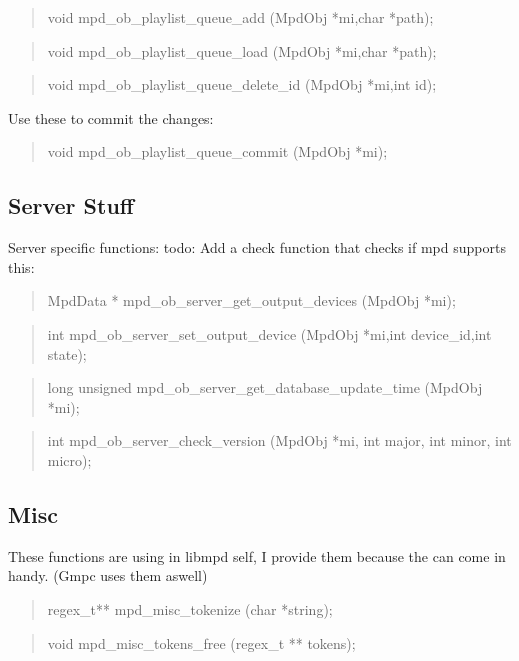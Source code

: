 \documentclass[a4paper,11pt]{article}
\begin{document}
	\begin{quote}
	void 		mpd\_ob\_playlist\_queue\_add		(MpdObj *mi,char *path);
	\end{quote}
	
	\begin{quote}
	void 		mpd\_ob\_playlist\_queue\_load		(MpdObj *mi,char *path);
	\end{quote}
	\begin{quote}
	void 		mpd\_ob\_playlist\_queue\_delete\_id		(MpdObj *mi,int id);
	\end{quote}
	
	Use these to commit the changes:
	\begin{quote}
	void 		mpd\_ob\_playlist\_queue\_commit		(MpdObj *mi);
	\end{quote}
	
	\subsection{Server Stuff}
	
	Server specific functions:
	todo: Add a check function that checks if mpd supports this:
	\begin{quote}
	MpdData * 	mpd\_ob\_server\_get\_output\_devices	(MpdObj *mi);
	\end{quote}
	
	\begin{quote}
	int 		mpd\_ob\_server\_set\_output\_device		(MpdObj *mi,int device\_id,int state);
	\end{quote}
	\begin{quote}
	long unsigned	mpd\_ob\_server\_get\_database\_update\_time	(MpdObj *mi);
	\end{quote}
	\begin{quote}
	int 		mpd\_ob\_server\_check\_version		(MpdObj *mi, int major, int minor, int micro);
	\end{quote}
	
	\subsection{Misc}
	
	
	These functions are using in libmpd self, I provide them because the can come in handy.
	(Gmpc uses them aswell)
	
	\begin{quote}
	regex\_t** 	mpd\_misc\_tokenize			(char *string);
	\end{quote}
	
	\begin{quote}
	void 		mpd\_misc\_tokens\_free			(regex\_t ** tokens);
	\end{quote}
	
	
\end{document}
